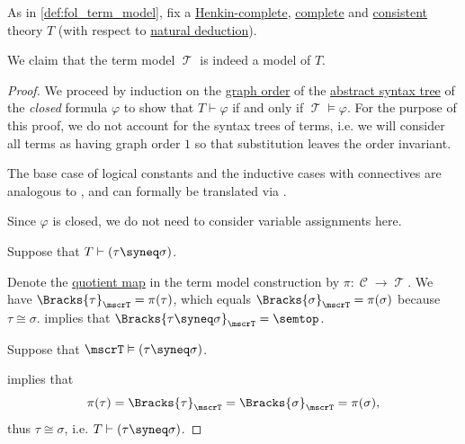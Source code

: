\begin{theorem}\label{thm:fol_model_existence_theorem}
  As in \cref{def:fol_term_model}, fix a \hyperref[def:fol_henkin_completeness]{Henkin-complete}, \hyperref[def:fol_theory/complete]{complete} and \hyperref[def:fol_theory/consistent]{consistent} theory \( T \) (with respect to \hyperref[def:fol_natural_deduction_system]{natural deduction}).

  We claim that the term model \( \mscrT \) is indeed a model of \( T \).
\end{theorem}
\begin{proof}
  We proceed by induction on the \hyperref[def:graph_cardinality/order]{graph order} of the \hyperref[def:fol_formula_ast]{abstract syntax tree} of the \emph{closed} formula \( \varphi \) to show that \( T \vdash \varphi \) if and only if \( \mscrT \vDash \varphi \). For the purpose of this proof, we do not account for the syntax trees of terms, i.e. we will consider all terms as having graph order \( 1 \) so that substitution leaves the order invariant.

  The base case of logical constants and the inductive cases with connectives are analogous to , and can formally be translated via .

   Since \( \varphi \) is closed, we do not need to consider variable assignments here.

  \SufficiencySubProof* Suppose that \( T \vdash (\tau \syneq \sigma) \).

  Denote the \hyperref[def:fol_quotient_structure/projection]{quotient map} in the term model construction by \( \pi: \mscrC \to \mscrT \). We have \( \Bracks{\tau}_\mscrT = \pi(\tau) \), which equals \( \Bracks{\sigma}_\mscrT = \pi(\sigma) \) because \( \tau \cong \sigma \).  implies that \( \Bracks{\tau \syneq \sigma}_\mscrT = \semtop \).

  \NecessitySubProof* Suppose that \( \mscrT \vDash (\tau \syneq \sigma) \).

   implies that
  \begin{equation*}
    \pi(\tau) = \Bracks{\tau}_\mscrT = \Bracks{\sigma}_\mscrT = \pi(\sigma),
  \end{equation*}
  thus \( \tau \cong \sigma \), i.e. \( T \vdash (\tau \syneq \sigma) \).


\end{proof}
